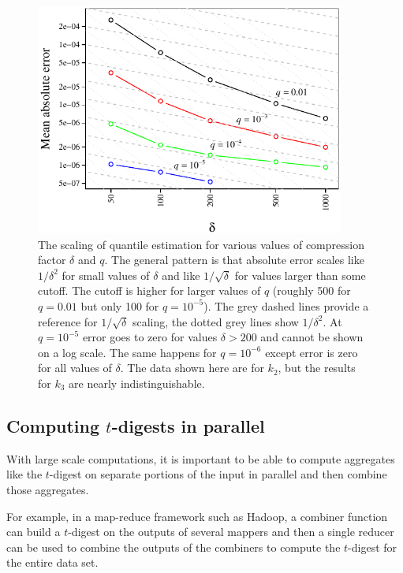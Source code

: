 \documentclass[]{statsoc}
\begin{document}
\begin{figure}[p] %
   \centering
   \includegraphics[width=4in]{figures/error-vs-compression.pdf} 
   \caption{The scaling of quantile estimation for various values of compression factor $\delta$ and $q$. 
   The general pattern is that absolute error scales like $1/\delta^2$ for small values of $\delta$ and like $1/\sqrt{\delta}$ for values larger than some cutoff. The cutoff is higher for larger values of $q$ (roughly 500 for $q=0.01$ but only 100 for $q=10^{-5}$). The grey dashed lines provide a reference for $1/\sqrt{\delta}$ scaling, the dotted grey lines show $1/\delta^2$.   At $q=10^{-5}$ error goes to zero for values $\delta > 200$ and cannot be shown on a log scale. The same happens for $q=10^{-6}$ except error is zero for all values of $\delta$. The data shown here are for $k_2$, but the results for $k_3$ are nearly indistinguishable.}
   \label{fig:accuracy-scaling}
\end{figure}

\subsection{Computing $t$-digests in parallel}
With large scale computations, it is important to be able to compute aggregates like the $t$-digest on separate portions of the input in parallel and then combine those aggregates.  

For example, in a map-reduce framework such as Hadoop, a combiner function can build a $t$-digest on the outputs of several mappers and then a single reducer can be used to combine the outputs of the combiners to compute the $t$-digest for the entire data set.  
\end{document}
